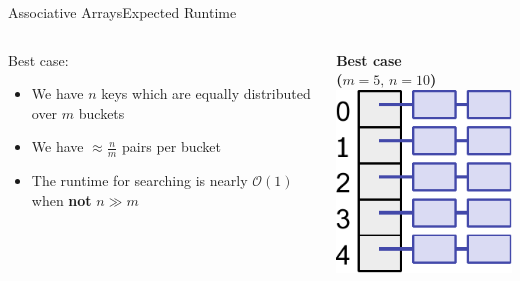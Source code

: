 \begin{frame}{Associative Arrays}{Expected Runtime}
  \begin{columns}
    \begin{column}{0.5\linewidth}
      {\color{MainA}Best case}:
      \begin{itemize}
        \item
          We have {\color{MainA}$n$} keys which are equally distributed over {\color{MainA}$m$} buckets
        \item
          We have {\color{MainA}$\approx \frac{n}{m}$} pairs per bucket
        \item
          The runtime for searching is nearly {\color{MainA}$\mathcal{O}(1)$}
          when \textbf{not} {\color{MainA}$n \gg m$}
      \end{itemize}
    \end{column}
    \begin{column}{0.5\linewidth}
      \begin{center}
        \textbf{Best case}\\
        \textbf{($m = 5, \, n = 10$)}\\[1em]
        \includegraphics[height=0.4\textheight]{Images/hash-uniform.pdf}

\end{center}
\end{column}
\end{columns}
\end{frame}
